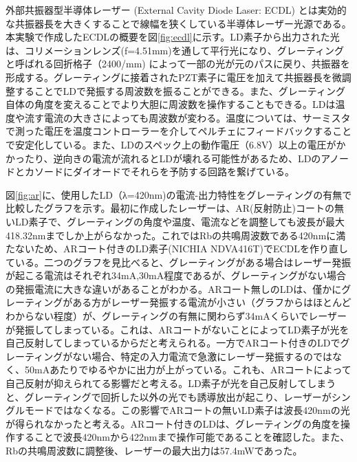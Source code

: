 \documentclass[dvipdfmx]{jsreport}
\begin{document}
外部共振器型半導体レーザー (External Cavity Diode Laser: ECDL) とは実効的な共振器長を大きくすることで線幅を狭くしている半導体レーザー光源である。\cite{suzuki}本実験で作成したECDLの概要を図\ref{fig:ecdl}に示す。LD素子から出力された光は、コリメーションレンズ(f=4.51mm)を通して平行光になり、グレーティングと呼ばれる回折格子（2400/mm) によって一部の光が元のパスに戻り、共振器を形成する。グレーティングに接着されたPZT素子に電圧を加えて共振器長を微調整することでLDで発振する周波数を振ることができる。また、グレーティング自体の角度を変えることでより大胆に周波数を操作することもできる。LDは温度や流す電流の大きさによっても周波数が変わる。温度については、サーミスタで測った電圧を温度コントローラーを介してペルチェにフィードバックすることで安定化している。また、LDのスペック上の動作電圧（6.8V）以上の電圧がかかったり、逆向きの電流が流れるとLDが壊れる可能性があるため、LDのアノードとカソードにダイオードでそれらを予防する回路を繋げている。
 
図\ref{fig:ar}に、使用したLD（λ=420nm)の電流-出力特性をグレーティングの有無で比較したグラフを示す。最初に作成したレーザーは、AR(反射防止)コートの無いLD素子で、グレーティングの角度や温度、電流などを調整しても波長が最大418.32nmまでしか上がらなかった。これではRbの共鳴周波数である420nmに満たないため、ARコート付きのLD素子(NICHIA NDVA416T)でECDLを作り直している。二つのグラフを見比べると、グレーティングがある場合はレーザー発振が起こる電流はそれぞれ34mA,30mA程度であるが、グレーティングがない場合の発振電流に大きな違いがあることがわかる。ARコート無しのLDは、僅かにグレーティングがある方がレーザー発振する電流が小さい（グラフからはほとんどわからない程度）が、グレーティングの有無に関わらず34mAくらいでレーザーが発振してしまっている。これは、ARコートがないことによってLD素子が光を自己反射してしまっているからだと考えられる。一方でARコート付きのLDでグレーティングがない場合、特定の入力電流で急激にレーザー発振するのではなく、50mAあたりでゆるやかに出力が上がっている。これも、ARコートによって自己反射が抑えられてる影響だと考える。LD素子が光を自己反射してしまうと、グレーティングで回折した以外の光でも誘導放出が起こり、レーザーがシングルモードではなくなる。この影響でARコートの無いLD素子は波長420nmの光が得られなかったと考える。ARコート付きのLDは、グレーティングの角度を操作することで波長420nmから422nmまで操作可能であることを確認した。また、Rbの共鳴周波数に調整後、レーザーの最大出力は57.4mWであった。
\end{document}
